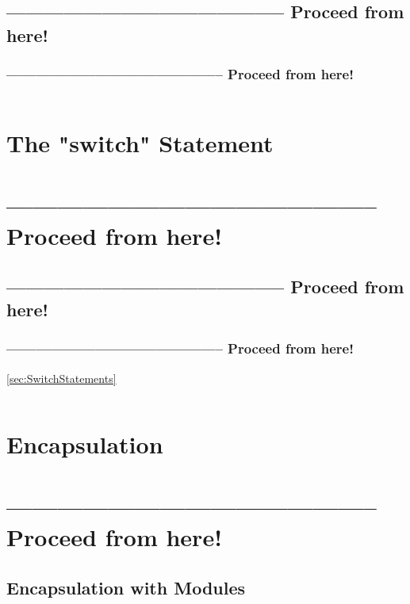 \documentclass[11pt,a4paper, titlepage, parskip=half, headsepline, footsepline, cleardoublepage=current, headheight=1cm]{scrbook}
\begin{document}
\subsection{-------------------------------------------- Proceed from here!}
\subsubsection{-------------------------------------------- Proceed from here!}
\autocite{Cymerman:SmarterJavaDevelopment}
\autocite{Fejer:ProgramToInterfaces}
\autocite{Pavlutin:ProgrammingToInterface}
\autocite{}
\autocite{}
\autocite{}
\autocite{}
\autocite{}
\autocite{}
\autocite{}
\lipsum[5]

\begin{lstlisting}
\end{lstlisting}

\section{The "switch" Statement}\label{sec:TheSwitchStatement}
\section{-------------------------------------------- Proceed from here!}
\subsection{-------------------------------------------- Proceed from here!}
\subsubsection{-------------------------------------------- Proceed from here!}
\lipsum[5]
\ref{sec:SwitchStatements}

\begin{lstlisting}
\end{lstlisting}

\section{Encapsulation}
\section{-------------------------------------------- Proceed from here!}
\lipsum[5]

\subsection{Encapsulation with Modules}\label{sec:EncapsulationWithModules}
\end{document}
